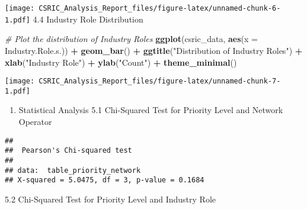 \documentclass[
]{article}
\newenvironment{Shaded}{\begin{snugshade}}{\end{snugshade}}
\newcommand{\AttributeTok}[1]{\textcolor[rgb]{0.13,0.29,0.53}{#1}}
\newcommand{\CommentTok}[1]{\textcolor[rgb]{0.56,0.35,0.01}{\textit{#1}}}
\newcommand{\FunctionTok}[1]{\textcolor[rgb]{0.13,0.29,0.53}{\textbf{#1}}}
\newcommand{\NormalTok}[1]{#1}
\newcommand{\OtherTok}[1]{\textcolor[rgb]{0.56,0.35,0.01}{#1}}
\newcommand{\SpecialCharTok}[1]{\textcolor[rgb]{0.81,0.36,0.00}{\textbf{#1}}}
\newcommand{\StringTok}[1]{\textcolor[rgb]{0.31,0.60,0.02}{#1}}
\providecommand{\tightlist}{%
  \setlength{\itemsep}{0pt}\setlength{\parskip}{0pt}}
\begin{document}
\texttt{[image: CSRIC\_Analysis\_Report\_files/figure-latex/unnamed-chunk-6-1.pdf]}
4.4 Industry Role Distribution

\begin{Shaded}
\begin{Highlighting}[]
\CommentTok{\# Plot the distribution of Industry Roles}
\FunctionTok{ggplot}\NormalTok{(csric\_data, }\FunctionTok{aes}\NormalTok{(}\AttributeTok{x =}\NormalTok{ Industry.Role.s.)) }\SpecialCharTok{+} 
  \FunctionTok{geom\_bar}\NormalTok{() }\SpecialCharTok{+} 
  \FunctionTok{ggtitle}\NormalTok{(}\StringTok{"Distribution of Industry Roles"}\NormalTok{) }\SpecialCharTok{+}
  \FunctionTok{xlab}\NormalTok{(}\StringTok{"Industry Role"}\NormalTok{) }\SpecialCharTok{+}
  \FunctionTok{ylab}\NormalTok{(}\StringTok{"Count"}\NormalTok{) }\SpecialCharTok{+}
  \FunctionTok{theme\_minimal}\NormalTok{()}
\end{Highlighting}
\end{Shaded}

\texttt{[image: CSRIC\_Analysis\_Report\_files/figure-latex/unnamed-chunk-7-1.pdf]}

\begin{enumerate}
\def\labelenumi{\arabic{enumi}.}
\setcounter{enumi}{4}
\tightlist
\item
  Statistical Analysis 5.1 Chi-Squared Test for Priority Level and
  Network Operator
\end{enumerate}

\begin{Shaded}
\end{Shaded}

\begin{verbatim}
## 
##  Pearson's Chi-squared test
## 
## data:  table_priority_network
## X-squared = 5.0475, df = 3, p-value = 0.1684
\end{verbatim}

5.2 Chi-Squared Test for Priority Level and Industry Role
\end{document}
